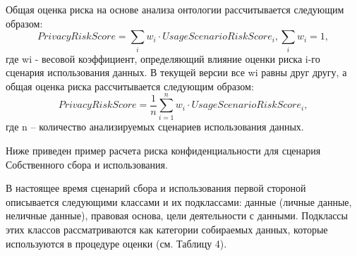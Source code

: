 \documentclass[../main]{subfiles}
\begin{document}
Общая оценка риска на основе анализа онтологии рассчитывается следующим образом: 
\begin{equation}
    \label{eq:formula1}
    PrivacyRiskScore = \sum_i{w_i} \cdot UsageScenarioRiskScore_i, \sum_{i}{w_i} = 1,
\end{equation}
где wi - весовой коэффициент, определяющий влияние оценки риска i-го сценария использования данных. В текущей версии все wi равны друг другу, а общая оценка риска рассчитывается следующим образом: 
\begin{equation}
    \label{eq:formula2}
    PrivacyRiskScore = \frac{1}{n}\sum^n_{i=1}{w_i} \cdot UsageScenarioRiskScore_i,
\end{equation}
где n -- количество анализируемых сценариев использования данных.

Ниже приведен пример расчета риска конфиденциальности для сценария Собственного сбора и использования.

В настоящее время сценарий сбора и использования первой стороной описывается следующими классами и их подклассами: данные (личные данные, неличные данные), правовая основа, цели деятельности с данными. Подклассы этих классов рассматриваются как категории собираемых данных, которые используются в процедуре оценки (см. Таблицу 4). 
\end{document}

